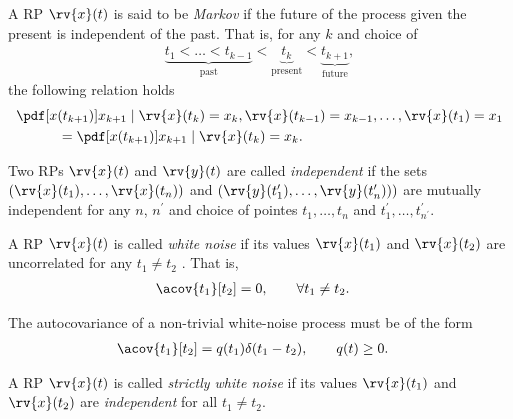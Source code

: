 \begin{definitionBox}[Markov RP]
    A RP $\rv{x}(t)$ is said to be \emph{Markov} if the future of the process given the present is independent of the past. That is, for any $k$ and choice of 
    \begin{align}
        \underbrace{t_{1} < \ldots < t_{k-1}}_{\text{past}} < \underbrace{t_{k}}_{\text{present}} < \underbrace{t_{k+1}}_{\text{future}},
    \end{align}
    the following relation holds
    \begin{align}
        &\pdf[x(t_{k+1})]{x_{k+1}\mid \rv{x}(t_{k})=x_{k}, \rv{x}(t_{k-1})=x_{k-1}, \ldots, \rv{x}(t_{1})=x_{1}}\\
        &\qquad\quad= \pdf[x(t_{k+1})]{x_{k+1} \mid \rv{x}(t_{k})=x_{k}}.
    \end{align}
\end{definitionBox}
%
\begin{definitionBox}
  Two RPs $\rv{x}(t)$ and $\rv{y}(t)$ are called \emph{independent} if the sets $(\rv{x}(t_{1}), \ldots, \rv{x}(t_{n}) )$ and $\left( \rv{y}(t_{1}^{\prime}), \ldots, \rv{y}(t_{n}^{\prime}) \right))$ are mutually independent for any $n$, $n^{\prime}$ and choice of pointes $t_{1}, \ldots, t_{n}$ and $t^{\prime}_{1}, \ldots, t^{\prime}_{n^{\prime}}$.
\end{definitionBox}

\begin{definitionBox}
    A RP $\rv{x}(t)$ is called \emph{white noise} if its values $\rv{x}(t_{1})$ and $\rv{x}(t_{2})$ are uncorrelated for any $t_{1}\neq t_{2}$ . That is,
    \begin{align}
        \acov{t_{1}}[t_{2}] &= 0, \qquad \forall t_{1}\neq t_{2}.
    \end{align}
\end{definitionBox}
\begin{myremark}
    The autocovariance of a non-trivial white-noise process must be of the form
    \begin{align}
        \acov{t_{1}}[t_{2}] &= q(t_{1})\delta (t_{1} - t_{2}), \qquad q(t)\geq 0.
    \end{align}
\end{myremark}

\begin{definitionBox}
    A RP $\rv{x}(t)$ is called \emph{strictly white noise} if its values $\rv{x}(t_{1})$ and $\rv{x}(t_{2})$ are \emph{independent} for all $t_{1}\neq t_{2}$.
\end{definitionBox}

